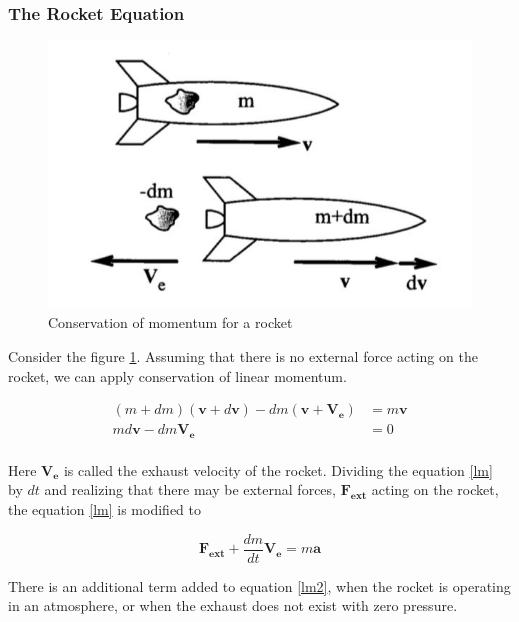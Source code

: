 \documentclass{article}
\theoremstyle{definition}
\begin{document}
\subsubsection{The Rocket Equation}

\begin{figure}[h]
    \centering
    \includegraphics[scale=0.3]{image 10.jpeg}
    \caption{Conservation of momentum for a rocket}
    \label{fig:rocket}
\end{figure}

Consider the figure \ref{fig:rocket}. Assuming that there is no external force acting on the rocket, we can apply conservation of linear momentum.

\begin{equation} \label{lm}
\begin{split}
    (m + dm)(\boldsymbol{v} + d\boldsymbol{v}) - dm(\boldsymbol{v} + \boldsymbol{V_e}) & = m\boldsymbol{v} \\
    md\boldsymbol{v} - dm\boldsymbol{V_e} & = 0\\
\end{split}
\end{equation}

Here $\boldsymbol{V_e}$ is called the exhaust velocity of the rocket.
Dividing the equation \ref{lm} by $dt$ and realizing that there may be external forces, $\boldsymbol{F_{ext}}$ acting on the rocket, the equation \ref{lm} is modified to

\begin{equation}\label{lm2}
    \boldsymbol{F_{ext}} + \frac{dm}{dt}\boldsymbol{V_e} = m\boldsymbol{a}
\end{equation}

There is an additional term added to equation \ref{lm2}, when the rocket is operating in an atmosphere, or when the exhaust does not exist with zero pressure.
\end{document}
